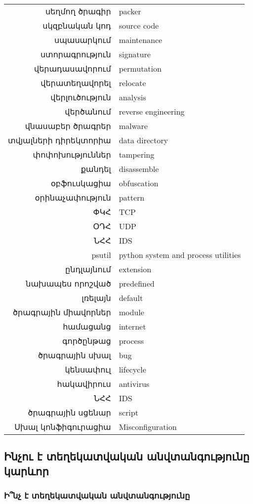 \documentclass[11pt]{article}
\begin{document}
\begin{sloppypar}
\begin{tabular}{rl}
սեղմող ծրագիր&packer \\
սկզբնական կոդ&source code \\
սպասարկում&maintenance \\
ստորագրություն&signature \\
վերադասավորում&permutation \\
վերատեղավորել&relocate \\
վերլուծություն&analysis \\
վերծանում&reverse engineering \\
վնասաբեր ծրագրեր&malware \\
տվյալների դիրեկտորիա&data directory \\
փոփոխություններ&tampering \\
քանդել&disassemble \\
օբֆուսկացիա&obfuscation \\
օրինաչափություն&pattern \\
ՓԿՀ&TCP \\
ՕԴՀ&UDP \\
ՆՀՀ&IDS \\
psutil&python system and process utilities \\
ընդլայնում&extension \\
նախապես որոշված&predefined \\
լռելայն&default \\
ծրագրային միավորներ&module \\
համացանց&internet \\
գործընթաց&process \\
ծրագրային սխալ&bug \\
կենսափուլ&lifecycle \\
հակավիրուս&antivirus \\
ՆՀՀ&IDS \\
ծրագրային սցենար&script \\
Սխալ կոնֆիգուրացիա&Misconfiguration \\
\end{tabular}


\subsection{Ինչու է տեղեկատվական անվտանգությունը կարևոր}


\subsubsection{Ի՞նչ է տեղեկատվական անվտանգությունը}


\end{sloppypar}
\end{document}
